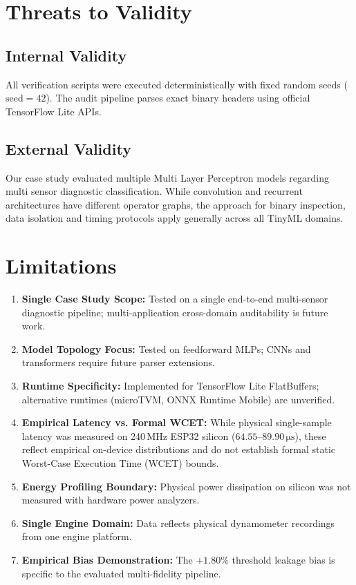 \documentclass[journal]{IEEEtran}
\begin{document}
\section{Threats to Validity}
\subsection{Internal Validity}
All verification scripts were executed deterministically with fixed random seeds ($\text{seed}=42$). The audit pipeline parses exact binary headers using official TensorFlow Lite APIs.

\subsection{External Validity}
Our case study evaluated multiple Multi Layer Perceptron models regarding multi sensor diagnostic classification. While convolution and recurrent architectures have different operator graphs, the approach for binary inspection, data isolation and timing protocols apply generally across all TinyML domains.

\section{Limitations}
\begin{enumerate}
    \item \textbf{Single Case Study Scope:} Tested on a single end-to-end multi-sensor diagnostic pipeline; multi-application cross-domain auditability is future work.
    \item \textbf{Model Topology Focus:} Tested on feedforward MLPs; CNNs and transformers require future parser extensions.
    \item \textbf{Runtime Specificity:} Implemented for TensorFlow Lite FlatBuffers; alternative runtimes (microTVM, ONNX Runtime Mobile) are unverified.
    \item \textbf{Empirical Latency vs. Formal WCET:} While physical single-sample latency was measured on 240\,MHz ESP32 silicon ($64.55\text{--}89.90\,\si{\micro\second}$), these reflect empirical on-device distributions and do not establish formal static Worst-Case Execution Time (WCET) bounds.
    \item \textbf{Energy Profiling Boundary:} Physical power dissipation on silicon was not measured with hardware power analyzers.
    \item \textbf{Single Engine Domain:} Data reflects physical dynamometer recordings from one engine platform.
    \item \textbf{Empirical Bias Demonstration:} The $+1.80\%$ threshold leakage bias is specific to the evaluated multi-fidelity pipeline.
\end{enumerate}
\end{document}
